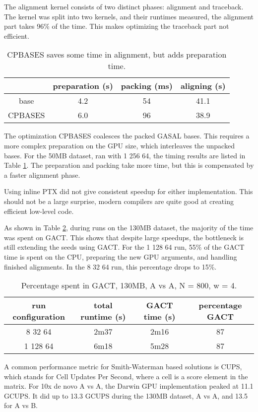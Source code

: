 \documentclass[../thesis.tex]{subfiles}
\begin{document}
The alignment kernel consists of two distinct phases: alignment and traceback.
The kernel was split into two kernels, and their runtimes measured, the alignment part takes 96\% of the time.
This makes optimizing the traceback part not efficient.

\begin{table}
\centering
\caption{CPBASES saves some time in alignment, but adds preparation time.}
\label{tbl:CPBASES}
\begin{tabular}{c c c c}
& preparation (s) & packing (ms) & aligning (s) \\ \hline
base & 4.2 & 54 & 41.1 \\
CPBASES & 6.0 & 96 & 38.9 \\
\end{tabular}
\end{table}

The optimization CPBASES coalesces the packed GASAL bases.
This requires a more complex preparation on the GPU size, which interleaves the unpacked bases.
For the 50MB dataset, ran with 1 256 64, the timing results are listed in Table \ref{tbl:CPBASES}.
The preparation and packing take more time, but this is compensated by a faster alignment phase.

Using inline PTX did not give consistent speedup for either implementation.
This should not be a large surprise, modern compilers are quite good at creating efficient low-level code.

As shown in Table \ref{tbl:darwin7}, during runs on the 130MB dataset, the majority of the time was spent on GACT.
This shows that despite large speedups, the bottleneck is still extending the seeds using GACT.
For the 1 128 64 run, 55\% of the GACT time is spent on the CPU, preparing the new GPU arguments, and handling finished alignments.
In the 8 32 64 run, this percentage drops to 15\%.
\begin{table}
\centering
\caption{Percentage spent in GACT, 130MB, A vs A, N = 800, w = 4.}
\label{tbl:darwin7}
\begin{tabular}{c|c c c}
run configuration & total runtime (s) & GACT time (s) & percentage GACT \\ \hline
8 32 64 & 2m37 & 2m16 & 87 \\
1 128 64 & 6m18 & 5m28 & 87 \\
\end{tabular}
\end{table}


A common performance metric for Smith-Waterman based solutions is CUPS, which stands for Cell Updates Per Second, where a cell is a score element in the matrix.
For 10x de novo A vs A, the Darwin GPU implementation peaked at 11.1 GCUPS.
It did up to 13.3 GCUPS during the 130MB dataset, A vs A, and 13.5 for A vs B.
\end{document}
